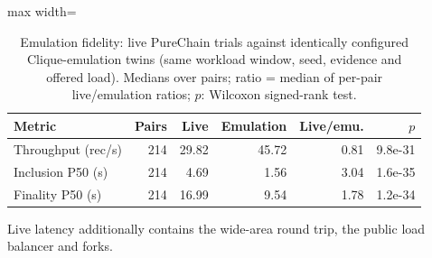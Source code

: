 \begin{table}[t]
\centering
\small
\caption{Emulation fidelity: live PureChain trials against identically configured Clique-emulation twins (same workload window, seed, evidence and offered load). Medians over pairs; ratio = median of per-pair live/emulation ratios; $p$: Wilcoxon signed-rank test.}
\label{tab:calibration}
\begin{adjustbox}{max width=\textwidth}
\begin{tabular}{lrrrrr}
\toprule
Metric & Pairs & Live & Emulation & Live/emu. & $p$ \\
\midrule
Throughput (rec/s) & 214 & 29.82 & 45.72 & 0.81 & 9.8e-31 \\
Inclusion P50 (s) & 214 & 4.69 & 1.56 & 3.04 & 1.6e-35 \\
Finality P50 (s) & 214 & 16.99 & 9.54 & 1.78 & 1.2e-34 \\
\bottomrule
\end{tabular}\end{adjustbox}
\par\smallskip\footnotesize Live latency additionally contains the wide-area round trip, the public load balancer and forks.
\end{table}
